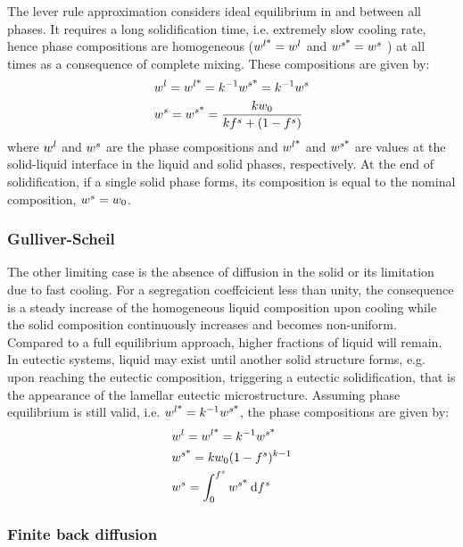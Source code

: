 The lever rule approximation considers ideal equilibrium in and between all phases. It requires a long solidification time, i.e. extremely slow cooling rate, hence phase compositions are 
homogeneous ($ {w}^{l \text{*}}  = {w}^l$ and $ {w}^{s \text{*}}  = {w}^s$ ) at all times as a consequence of complete mixing. 
These compositions are given by:
\begin{align}
\label{eq:leverrule}
& {w}^l= {w}^{l \text{*}}  = k^{-1} {w}^{s \text{*}}  = k^{-1} {w}^s \\
& {w}^s= {w}^{s \text{*}}  = \frac{k {w}_0}{k{f^s} + (1-{f^s})}
\end{align}
where ${w}^l$ and ${w}^s$ are the phase compositions and ${w}^{l \text{*}} $ and ${w}^{s \text{*}} $ are values at the solid-liquid interface in the liquid and solid phases, respectively.  At the end of solidification, if a single solid phase forms, its composition is equal to the nominal composition, ${w}^s = {w}_0$.

\subsubsection*{Gulliver-Scheil}

The other limiting case is the absence of diffusion in the solid or its limitation due to fast cooling.
For a segregation coeffcicient less than unity, the consequence is a steady increase  of the homogeneous liquid composition
upon cooling while the solid composition continuously increases and becomes non-uniform.
Compared to a full equilibrium approach, higher fractions of liquid will remain. In eutectic systems, liquid may exist until 
another solid structure forms, e.g. upon reaching the eutectic composition, 
triggering a eutectic solidification, that is the appearance of the lamellar eutectic microstructure. 
Assuming phase equilibrium is still valid, i.e. ${w}^{l \text{*}} =k^{-1} {w}^{s \text{*}} $, the phase compositions are given by:
\begin{align}
\label{eq:scheil1}
& {w}^l= {w}^{l \text{*}}  = k^{-1} {w}^{s \text{*}}  \\
\label{eq:scheil2}
& {w}^{s \text{*}} = k {w}_0 (1-{f^s})^{k-1} \\
\label{eq:scheil3}
& {w}^s = \int_{0}^{f^s} {w}^{s \text{*}} \: \mathrm{d}f^s
\end{align}

\subsubsection*{Finite back diffusion}

